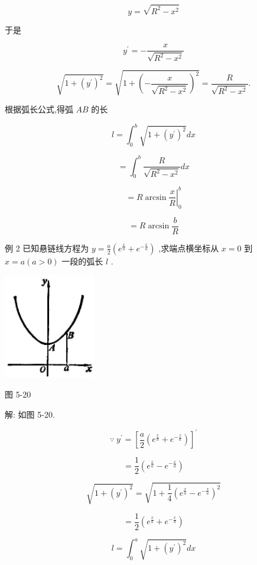 \documentclass[lang=cn,newtx,12pt,scheme=chinese]{elegantbook}
\begin{document}
\[
y = \sqrt{{R}^{2} - {x}^{2}}
\]

于是

\[
{y}^{\prime } = - \frac{x}{\sqrt{{R}^{2} - {x}^{2}}}
\]

\[
\sqrt{1 + {\left( {y}^{\prime }\right) }^{2}} = \sqrt{1 + {\left( -\frac{x}{\sqrt{{R}^{2} - {x}^{2}}}\right) }^{2}} = \frac{R}{\sqrt{{R}^{2} - {x}^{2}}}.
\]

根据弧长公式,得弧 \({AB}\) 的长

\[
l = {\int }_{0}^{b}\sqrt{1 + {\left( {y}^{\prime }\right) }^{2}}{dx}
\]

\[
= {\int }_{0}^{b}\frac{R}{\sqrt{{R}^{2} - {x}^{2}}}{dx}
\]

\[
= {\left. R\arcsin \frac{x}{R}\right| }_{0}^{b}
\]

\[
= R\arcsin \frac{b}{R}
\]

例 2 已知悬链线方程为 \(y = \frac{a}{2}\left( {{e}^{\frac{x}{a}} + {e}^{-\frac{x}{a}}}\right)\) ,求端点横坐标从 \(x = 0\) 到 \(x = a\left( {a > 0}\right)\) 一段的弧长 \(l\) .

\begin{center}
\includegraphics[max width=0.3\textwidth]{images/01912c18-5c3f-733d-b775-749ba9897a9d_243_219487.jpg}
\end{center}

图 5-20

解: 如图 5-20.

\[
\because \;{y}^{\prime } = {\left\lbrack \frac{a}{2}\left( {e}^{\frac{x}{a}} + {e}^{-\frac{x}{a}}\right) \right\rbrack }^{\prime }
\]

\[
= \frac{1}{2}\left( {{e}^{\frac{x}{a}} - {e}^{-\frac{x}{a}}}\right)
\]

\[
\sqrt{1 + {\left( {y}^{\prime }\right) }^{2}} = \sqrt{1 + \frac{1}{4}{\left( {e}^{\frac{x}{a}} - {e}^{-\frac{x}{a}}\right) }^{2}}
\]

\[
= \frac{1}{2}\left( {{e}^{\frac{x}{a}} + {e}^{-\frac{x}{a}}}\right)
\]

\[
l = {\int }_{0}^{a}\sqrt{1 + {\left( {y}^{\prime }\right) }^{2}}{dx}
\]
\end{document}
